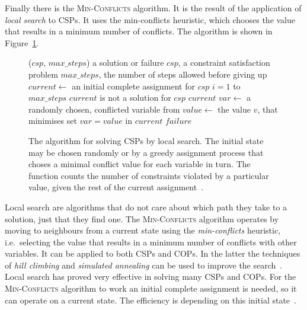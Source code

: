 Finally there is the \textsc{Min-Conflicts} algorithm. It is the result of the application of \textit{local search} to CSPs. It uses the min-conflicts heuristic, which chooses the value that results in a minimum number of conflicts. The algorithm is shown in Figure~\ref{fig:minConflicts}.
\begin{figure}[ht!p]
	\hspace{-70pt}
	\newsavebox{\fmbox}
	\begin{lrbox}{\fmbox}
	\begin{minipage}{.75\largefigure}
		\vspace{-5pt}
		\begin{codebox}
\zi {}($csp$, $max\_steps$)  a solution or failure
    \Indentmore
\zi {}
    \Indentmore
    \zi $csp$, a constraint satisfaction problem
    \zi $max\_steps$, the number of steps allowed before giving up \End
\zi $current \leftarrow$ an initial complete assignment for $csp$
    \zi \For $i = 1$ to $max\_steps$  \Do
    \zi     \If $current$ is not a solution for $csp$
    \zi     \Then \Return $current$ \End
    \zi     $var \leftarrow$ a randomly chosen,
    \zi     \hspace{28pt} conflicted variable from 
    \zi     $value \leftarrow$ the value $v$,
    \zi     \hspace{37pt} that minimises 
    \zi     set $var = value$ in $current$ \End
    \zi \Return $failure$
    \End
		\end{codebox}
		\vspace{-5pt}
	\end{minipage}
	\end{lrbox}\fbox{\usebox{\fmbox}}
	\caption{The  algorithm for solving CSPs by local search. The initial state may be chosen randomly or by a greedy assignment process that choses a minimal conflict value for each variable in turn. The  function counts the number of constraints violated by a particular value, given the rest of the current assignment~\protect\cite[p. 151]{AIRussell}.}
	\label{fig:minConflicts}
\end{figure}

Local search are algorithms that do not care about which path they take to a solution, just that they find one. The \textsc{Min-Conflicts} algorithm operates by moving to neighbours from a current state using the \emph{min-conflicts} heuristic, i.e.\ selecting the value that results in a minimum number of conflicts with other variables. It can be applied to both CSPs and COPs. In the latter the techniques of \emph{hill climbing} and \emph{simulated annealing} can be used to improve the search~\cite{LSVossen}. Local search has proved very effective in solving many CSPs and COPs. For the \textsc{Min-Conflicts} algorithm to work an initial complete assignment is needed, so it can operate on a current state. The efficiency is depending on this initial state~\cite{AIRussell}.

